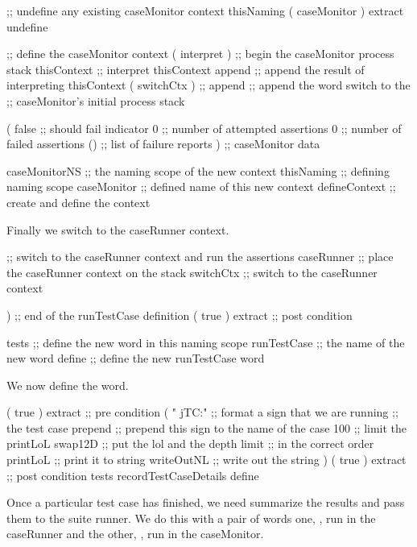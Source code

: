 \startJoylolCode
  ;; undefine any existing caseMonitor context
  thisNaming
  ( caseMonitor ) extract
  undefine

  ;; define the caseMonitor context
  ( interpret ) ;; begin the caseMonitor process stack
  thisContext   ;; interpret thisContext 
  append        ;; append the result of interpreting thisContext
  ( switchCtx ) ;; 
  append        ;; append the word switch to the
                ;; caseMonitor's initial process stack
  
  ( 
    false       ;; should fail indicator
    0           ;; number of attempted assertions
    0           ;; number of failed assertions
    ()          ;; list of failure reports
  )             ;; caseMonitor data

  caseMonitorNS ;; the naming scope of the new context
  thisNaming    ;; defining naming scope
  caseMonitor   ;; defined name of this new context
  defineContext ;; create and define the context
\stopJoylolCode

Finally we switch to the caseRunner context.

\startJoylolCode
  ;; switch to the caseRunner context and run the assertions
  caseRunner ;; place the caseRunner context on the stack
  switchCtx  ;; switch to the caseRunner context
  
)            ;; end of the runTestCase definition
( { true } ) extract ;; post condition

tests        ;; define the new word in this naming scope
runTestCase  ;; the name of the new word
define       ;; define the new runTestCase word
\stopJoylolCode

We now define the  word.

\startJoylolCode
( { true } ) extract ;; pre condition
(
  "  jTC:"    ;; format a sign that we are running
              ;; the test case
  prepend     ;; prepend this sign to the name of the case
  100         ;; limit the printLoL
  swap12D     ;; put the lol and the depth limit
              ;; in the correct order
  printLoL    ;; print it to string
  writeOutNL  ;; write out the string
)
( { true } ) extract ;; post condition
tests
recordTestCaseDetails
define
\stopJoylolCode
\stopTestSuite


Once a particular test case has finished, we need summarize the results 
and pass them to the suite runner. We do this with a pair of words one, 
, run in the caseRunner and the other, 
, run in the caseMonitor. 

